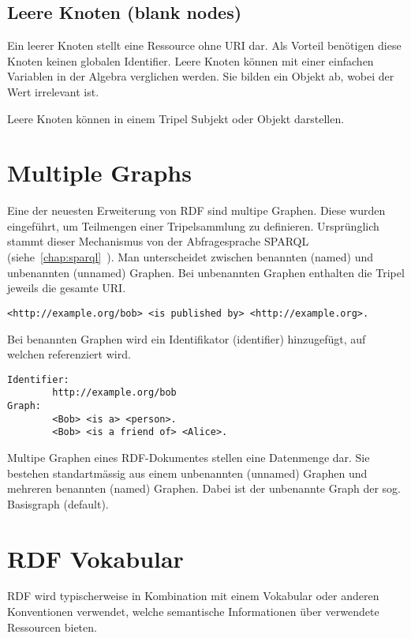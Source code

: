 \subsection{Leere Knoten (blank nodes)}
\label{sec:rdf_rdf_dataModel_blankNodes}
Ein leerer Knoten stellt eine Ressource ohne URI dar. Als Vorteil benötigen diese Knoten keinen globalen Identifier. Leere Knoten können mit einer einfachen Variablen in der Algebra verglichen werden. Sie bilden ein Objekt ab, wobei der Wert irrelevant ist.

Leere Knoten können in einem Tripel Subjekt oder Objekt darstellen.

\section{Multiple Graphs}
\label{sec:owlRdf_rdf_dataModel_multipleGraphs}
Eine der neuesten Erweiterung von RDF sind multipe Graphen. Diese wurden eingeführt, um Teilmengen einer Tripelsammlung zu definieren. Ursprünglich stammt dieser Mechanismus von der Abfragesprache SPARQL (siehe~\ref{chap:sparql}~). Man unterscheidet zwischen benannten (named) und unbenannten (unnamed) Graphen. Bei unbenannten Graphen enthalten die Tripel jeweils die gesamte URI.\@

\begin{lstlisting}[caption={Beispiel eines unbenannten (unnamed) Graphen}]
    <http://example.org/bob> <is published by> <http://example.org>.
\end{lstlisting}

Bei benannten Graphen wird ein Identifikator (identifier) hinzugefügt, auf welchen referenziert wird.

\begin{lstlisting}[caption={Beispiel eines benannten (named) Graphen}]
Identifier: 
        http://example.org/bob
Graph:
        <Bob> <is a> <person>.
        <Bob> <is a friend of> <Alice>.
\end{lstlisting}

Multipe Graphen eines RDF-Dokumentes stellen eine Datenmenge dar. Sie bestehen standartmässig aus einem unbenannten (unnamed) Graphen und mehreren benannten (named) Graphen. Dabei ist der unbenannte Graph der sog. Basisgraph (default).

\section{RDF Vokabular}
\label{sec:rdf_rdf_voca}
RDF wird typischerweise in Kombination mit einem Vokabular oder anderen Konventionen verwendet, welche semantische Informationen über verwendete Ressourcen bieten.

